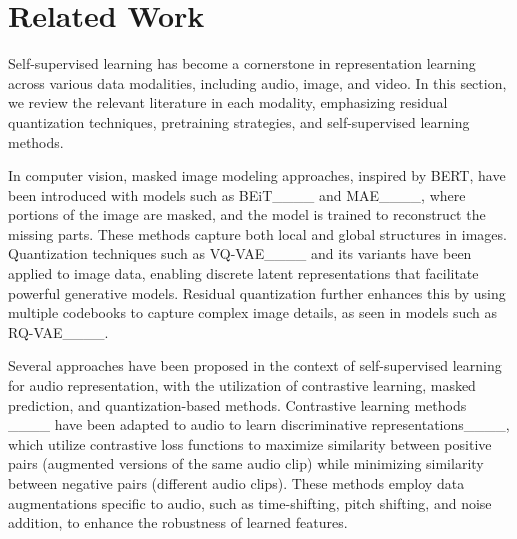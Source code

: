 \section{Related Work}

Self-supervised learning has become a cornerstone in representation learning across various data modalities, including audio, image, and video. In this section, we review the relevant literature in each modality, emphasizing residual quantization techniques, pretraining strategies, and self-supervised learning methods.

In computer vision, masked image modeling approaches, inspired by BERT, have been introduced with models such as BEiT____ and MAE____, where portions of the image are masked, and the model is trained to reconstruct the missing parts. These methods capture both local and global structures in images.
Quantization techniques such as VQ-VAE____ and its variants have been applied to image data, enabling discrete latent representations that facilitate powerful generative models. Residual quantization further enhances this by using multiple codebooks to capture complex image details, as seen in models such as RQ-VAE____.

Several approaches have been proposed in the context of self-supervised learning for audio representation, with the utilization of contrastive learning, masked prediction, and quantization-based methods. Contrastive learning methods ____ have been adapted to audio to learn discriminative representations____, which utilize contrastive loss functions to maximize similarity between positive pairs (augmented versions of the same audio clip) while minimizing similarity between negative pairs (different audio clips). These methods employ data augmentations specific to audio, such as time-shifting, pitch shifting, and noise addition, to enhance the robustness of learned features.



